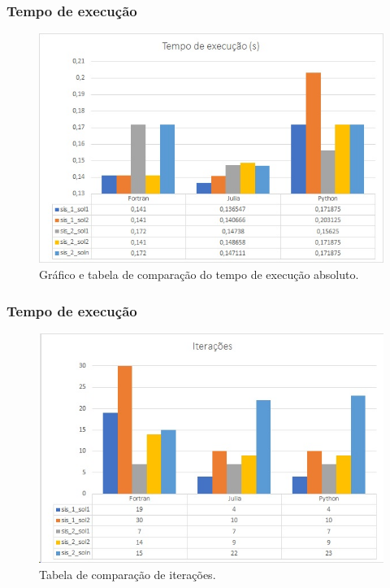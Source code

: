 \documentclass[aspectratio=1610]{beamer}
\begin{document}

\begin{frame}
\frametitle{Tempo de execução}


\begin{figure}
  \centering
  \includegraphics[scale=0.55]{Imagens/graf.jpg}
  \caption{Gráfico e tabela de comparação do tempo de execução absoluto.}
\end{figure}


\end{frame}



\begin{frame}
\frametitle{Tempo de execução}


\begin{figure}
  \centering
  \includegraphics[scale=0.55]{Imagens/iter.jpg}
  \caption{Tabela de comparação de iterações.}
\end{figure}


\end{frame}
\end{document}

